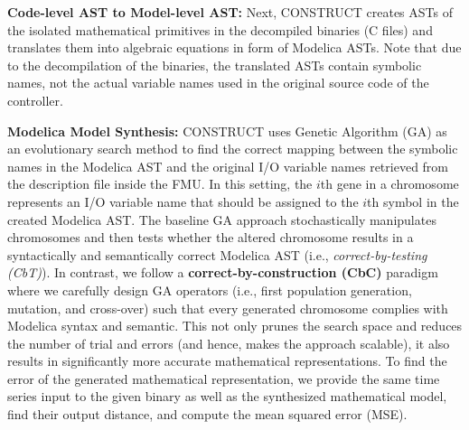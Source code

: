 \documentclass[10pt,conference]{IEEEtran}
\newcommand{\ali}[1]{\textcolor{blue}{{\it Ali:#1}}}
\newcommand{\shantanu}[1]{\textcolor{red}{{ \it Shantanu:#1}}}
\newcommand*\squared[1]{\tikz[baseline=(char.base)]{
\node[shape=rectangle,font=\bfseries,thin,draw=black,fill=yellow,text=black,inner sep=1pt] (char) {#1};}}
\begin{document}
    \squared{3} \textbf{Code-level AST to Model-level AST:} Next, CONSTRUCT creates ASTs of the isolated mathematical primitives in the decompiled binaries (C files) and translates them into algebraic equations in form of Modelica ASTs. Note that due to the decompilation of the binaries, the translated ASTs contain symbolic names, not the actual variable names used in the original source code of the controller.  %
    
    \squared{4} \textbf{Modelica Model Synthesis:} \textsc{CONSTRUCT} uses Genetic Algorithm (GA) as an evolutionary search method to find the correct mapping between the symbolic names in the Modelica AST and the original I/O variable names retrieved from the description file inside the FMU. In this setting, the $i$th gene in a chromosome represents an I/O variable name that should be assigned to the $i$th symbol in the created Modelica AST. The baseline GA approach stochastically manipulates chromosomes and then tests whether the altered chromosome results in a syntactically and semantically correct Modelica AST (i.e., \textit{correct-by-testing (CbT)}). In contrast, we follow a \textbf{correct-by-construction (CbC)} paradigm where we carefully design GA operators (i.e., first population generation, mutation, and cross-over) such that every generated chromosome complies with Modelica syntax and semantic. This not only prunes the search space and reduces the number of trial and errors (and hence, makes the approach scalable), it also results in significantly more accurate mathematical representations. 
    To find the error of the generated mathematical representation, we provide the same time series input to the given binary as well as the synthesized mathematical model, find their output distance, and compute the mean squared error (MSE).
 
\end{document}
